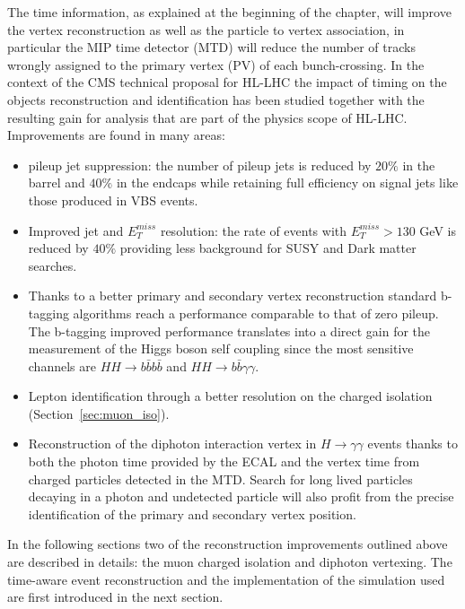 The time information, as explained at the beginning of the chapter, will improve the vertex reconstruction as
well as the particle to vertex association, in particular the MIP time detector (MTD) will reduce the
number of tracks wrongly assigned to the primary vertex (PV) of each bunch-crossing.
In the context of the CMS technical proposal for HL-LHC the impact of timing on the objects reconstruction and
identification has been studied together with the resulting gain for analysis that are part of the physics scope
of HL-LHC.
Improvements are found in many areas:
\begin{itemize}
\item pileup jet suppression: the number of pileup jets is reduced by $20\%$ in the barrel and $40\%$ in the endcaps
  while retaining full efficiency on signal jets like those produced in VBS events.
\item Improved jet and $E_T^{miss}$ resolution: the rate of events with $E_T^{miss}>130$ GeV is reduced by
  $40\%$ providing less background for SUSY and Dark matter searches.
\item Thanks to a better primary and secondary vertex reconstruction standard b-tagging algorithms reach
  a performance comparable to that of zero pileup. The b-tagging improved performance translates into
  a direct gain for the measurement of the Higgs boson self coupling since the most sensitive channels
  are $HH\to b\bar{b}b\bar{b}$ and $HH \to b\bar{b}\gamma\gamma$. 
\item Lepton identification through a better resolution on the charged isolation (Section~\ref{sec:muon_iso}).
\item Reconstruction of the diphoton interaction vertex in $H\to\gamma\gamma$ events thanks to both the photon time
  provided by the ECAL and the vertex time from charged particles detected in the MTD. Search for long lived particles
  decaying in a photon and undetected particle will also profit from the precise identification of the primary and
  secondary vertex position. 
\end{itemize}

In the following sections two of the reconstruction improvements outlined above are described in details:
the muon charged isolation and diphoton vertexing. The time-aware event reconstruction and the implementation
of the simulation used are first introduced in the next section.

